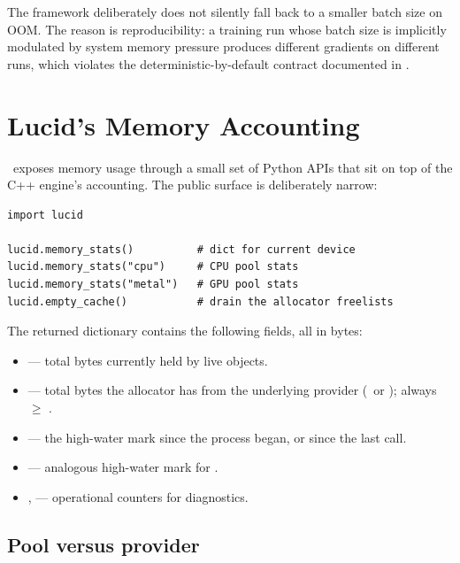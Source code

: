 The framework deliberately does not silently fall back to a smaller
batch size on OOM. The reason is reproducibility: a training run
whose batch size is implicitly modulated by system memory pressure
produces different gradients on different runs, which violates the
deterministic-by-default contract documented in
.

\section{Lucid's Memory Accounting}
\label{sec:unified_memory:accounting}

\Lucid\ exposes memory usage through a small set of Python APIs that
sit on top of the C++ engine's accounting. The public surface is
deliberately narrow:

\begin{lstlisting}[style=lucid,language=LucidPython]
import lucid

lucid.memory_stats()          # dict for current device
lucid.memory_stats("cpu")     # CPU pool stats
lucid.memory_stats("metal")   # GPU pool stats
lucid.empty_cache()           # drain the allocator freelists
\end{lstlisting}

The returned dictionary contains the following fields, all in bytes:

\begin{itemize}
  \item {} --- total bytes currently held by live
     objects.
  \item {} --- total bytes the allocator has from the
    underlying provider (\MLX\ or \Accelerate); always
    \(\geq\) .
  \item {} --- the high-water mark since the
    process began, or since the last  call.
  \item {} --- analogous high-water mark for
    .
  \item {},  ---
    operational counters for diagnostics.
\end{itemize}

\subsection{Pool versus provider}
\label{ssec:unified_memory:pool_vs_provider}

